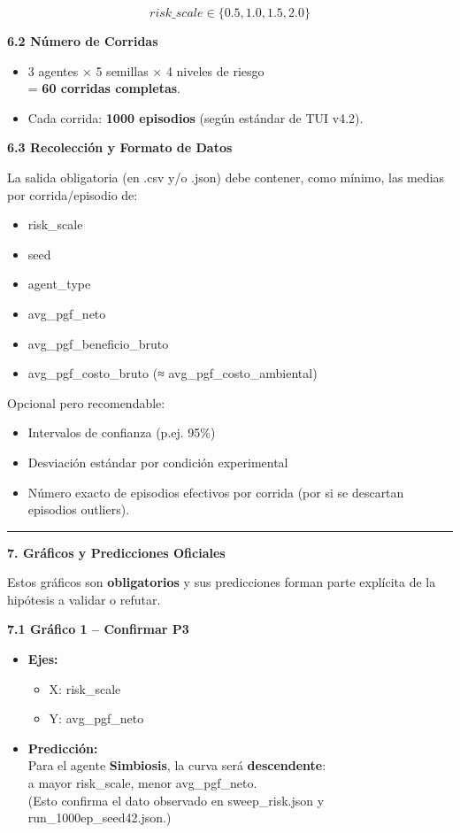 \[risk\_ scale \in \{ 0.5,1.0,1.5,2.0\}
\]

\textbf{6.2 Número de Corridas}

\begin{itemize}
\item
  3 agentes × 5 semillas × 4 niveles de riesgo\\
  = \textbf{60 corridas completas}.
\item
  Cada corrida: \textbf{1000 episodios} (según estándar de TUI v4.2).
\end{itemize}

\textbf{6.3 Recolección y Formato de Datos}

La salida obligatoria (en .csv y/o .json) debe contener, como mínimo,
las medias por corrida/episodio de:

\begin{itemize}
\item
  risk\_scale
\item
  seed
\item
  agent\_type
\item
  avg\_pgf\_neto
\item
  avg\_pgf\_beneficio\_bruto
\item
  avg\_pgf\_costo\_bruto (≈ avg\_pgf\_costo\_ambiental)
\end{itemize}

Opcional pero recomendable:

\begin{itemize}
\item
  Intervalos de confianza (p.ej. 95\%)
\item
  Desviación estándar por condición experimental
\item
  Número exacto de episodios efectivos por corrida (por si se descartan
  episodios outliers).
\end{itemize}

\begin{center}\rule{0.5\linewidth}{0.5pt}\end{center}

\textbf{7. Gráficos y Predicciones Oficiales}

Estos gráficos son \textbf{obligatorios} y sus predicciones forman parte
explícita de la hipótesis a validar o refutar.

\textbf{7.1 Gráfico 1 -- Confirmar P3}

\begin{itemize}
\item
  \textbf{Ejes:}

  \begin{itemize}
  \item
    X: risk\_scale
  \item
    Y: avg\_pgf\_neto
  \end{itemize}
\item
  \textbf{Predicción:}\\
  Para el agente \textbf{Simbiosis}, la curva será
  \textbf{descendente}:\\
  a mayor risk\_scale, menor avg\_pgf\_neto.\\
  (Esto confirma el dato observado en sweep\_risk.json y
  run\_1000ep\_seed42.json.)
\end{itemize}

